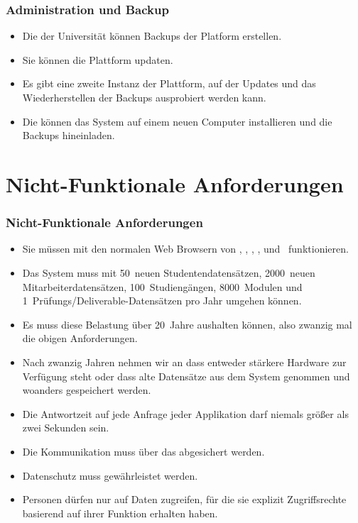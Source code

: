 \documentclass[aspectratio=169,mathserif,notheorems]{beamer}%
\begin{document}
%
\begin{frame}%
\frametitle{Administration und Backup}%
\begin{itemize}%
\item Die  der Universität können Backups der Platform erstellen.%
%
\item<2-> Sie können die Plattform updaten.%
%
\item<3-> Es gibt eine zweite Instanz der Plattform, auf der Updates und das Wiederherstellen der Backups ausprobiert werden kann.%
%
\item<4-> Die  können das System auf einem neuen Computer installieren und die Backups hineinladen.%
\end{itemize}%
\end{frame}%
%
\section{Nicht-Funktionale Anforderungen}%
%
\begin{frame}[t]%
\frametitle{Nicht-Funktionale Anforderungen}%
\begin{itemize}%
%
%
%
\item<2-> Sie müssen mit den normalen Web Browsern von \microsoftWindows, \linux, \macOS, \appleIOS, \iPadOS und \android\ funktionieren.%
%
\item<3-> Das System muss mit 50~neuen Studentendatensätzen, 2000~neuen Mitarbeiterdatensätzen, 100~Studiengängen, 8000~Modulen und 1~Prüfungs/Deliverable-Datensätzen pro Jahr umgehen können.%
%
\item<4-> Es muss diese Belastung über 20~Jahre aushalten können, also zwanzig mal die obigen Anforderungen.%
%
\item<5-> Nach zwanzig Jahren nehmen wir an dass entweder stärkere Hardware zur Verfügung steht oder dass alte Datensätze aus dem System genommen und woanders gespeichert werden.%
%
\item<6-> Die Antwortzeit auf jede Anfrage jeder Applikation darf niemals größer als zwei Sekunden sein.%
%
\item<7-> Die Kommunikation muss über das  abgesichert werden.%
%
\item<8-> Datenschutz muss gewährleistet werden.%
%
\item<9-> Personen dürfen nur auf Daten zugreifen, für die sie explizit Zugriffsrechte basierend auf ihrer Funktion erhalten haben.
\end{itemize}%
\end{frame}%
%
\end{document}
